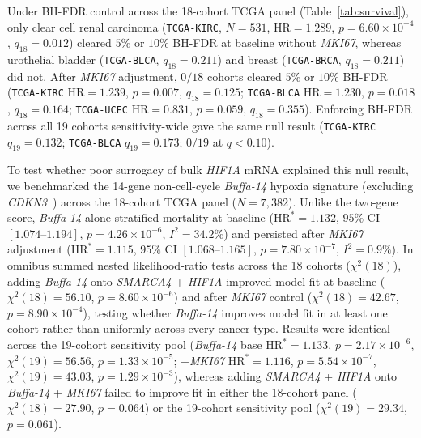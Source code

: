 \documentclass[11pt]{article}
\begin{document}
Under BH-FDR control across the 18-cohort TCGA panel (Table~\ref{tab:survival}), only clear cell renal carcinoma (\texttt{TCGA-KIRC}, $N = 531$, $\text{HR} = 1.289$, $p = 6.60 \times 10^{-4}$, $q_{18} = 0.012$) cleared $5\%$ or $10\%$ BH-FDR at baseline without \textit{MKI67}, whereas urothelial bladder (\texttt{TCGA-BLCA}, $q_{18} = 0.211$) and breast (\texttt{TCGA-BRCA}, $q_{18} = 0.211$) did not. After \textit{MKI67} adjustment, $0/18$ cohorts cleared $5\%$ or $10\%$ BH-FDR (\texttt{TCGA-KIRC} $\text{HR} = 1.239$, $p = 0.007$, $q_{18} = 0.125$; \texttt{TCGA-BLCA} $\text{HR} = 1.230$, $p = 0.018$, $q_{18} = 0.164$; \texttt{TCGA-UCEC} $\text{HR} = 0.831$, $p = 0.059$, $q_{18} = 0.355$). Enforcing BH-FDR across all 19 cohorts sensitivity-wide gave the same null result (\texttt{TCGA-KIRC} $q_{19} = 0.132$; \texttt{TCGA-BLCA} $q_{19} = 0.173$; $0/19$ at $q < 0.10$).

To test whether poor surrogacy of bulk \textit{HIF1A} mRNA explained this null result, we benchmarked the 14-gene non-cell-cycle \textit{Buffa-14} hypoxia signature (excluding \textit{CDKN3}~\cite{buffa2010}) across the 18-cohort TCGA panel ($N = 7,382$). Unlike the two-gene score, \textit{Buffa-14} alone stratified mortality at baseline ($\text{HR}^* = 1.132$, $95\%$ CI $[1.074\text{--}1.194]$, $p = 4.26 \times 10^{-6}$, $I^2 = 34.2\%$) and persisted after \textit{MKI67} adjustment ($\text{HR}^* = 1.115$, $95\%$ CI $[1.068\text{--}1.165]$, $p = 7.80 \times 10^{-7}$, $I^2 = 0.9\%$). In omnibus summed nested likelihood-ratio tests across the 18 cohorts ($\chi^2(18)$), adding \textit{Buffa-14} onto \textit{SMARCA4} + \textit{HIF1A} improved model fit at baseline ($\chi^2(18) = 56.10$, $p = 8.60 \times 10^{-6}$) and after \textit{MKI67} control ($\chi^2(18) = 42.67$, $p = 8.90 \times 10^{-4}$), testing whether \textit{Buffa-14} improves model fit in at least one cohort rather than uniformly across every cancer type. Results were identical across the 19-cohort sensitivity pool (\textit{Buffa-14} base $\text{HR}^* = 1.133$, $p = 2.17 \times 10^{-6}$, $\chi^2(19) = 56.56$, $p = 1.33 \times 10^{-5}$; +\textit{MKI67} $\text{HR}^* = 1.116$, $p = 5.54 \times 10^{-7}$, $\chi^2(19) = 43.03$, $p = 1.29 \times 10^{-3}$), whereas adding \textit{SMARCA4} + \textit{HIF1A} onto \textit{Buffa-14} + \textit{MKI67} failed to improve fit in either the 18-cohort panel ($\chi^2(18) = 27.90$, $p = 0.064$) or the 19-cohort sensitivity pool ($\chi^2(19) = 29.34$, $p = 0.061$).
\end{document}
